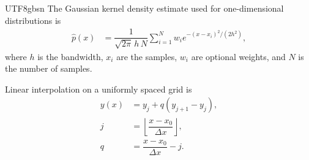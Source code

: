 \documentclass[trackchanges, twocolappendix, twocolumn]{aastex701}
\begin{document}
\begin{CJK*}{UTF8}{gbsn}
The Gaussian kernel density estimate used for one-dimensional distributions is
\begin{align}
\widehat{p}(x) &=
\dfrac{1}{\sqrt{2\pi}\,h\,N}
\sum_{i=1}^{N} w_i
e^{-(x-x_i)^2/(2h^2)},
\end{align}
where $h$ is the bandwidth, $x_i$ are the samples, $w_i$ are optional weights, and $N$ is the number of samples.

Linear interpolation on a uniformly spaced grid is
\begin{align}
y(x) &= y_j + q(y_{j+1}-y_j),\\
j &= \left\lfloor \dfrac{x-x_0}{\Delta x}\right\rfloor,\\
q &= \dfrac{x-x_0}{\Delta x}-j.
\end{align}


{}




\end{CJK*}
\end{document}
